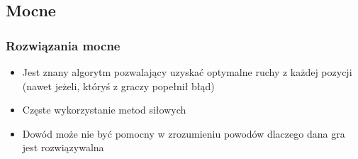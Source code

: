 \documentclass[polish,envcountsect,10pt]{beamer}
\begin{document}
        \subsection{Mocne}
            \begin{frame}
                \frametitle{Rozwiązania mocne}
                \begin{itemize}
                    \item<1-> Jest znany algorytm pozwalający uzyskać optymalne ruchy z każdej pozycji (nawet jeżeli, któryś z graczy popełnił błąd)
                    \item<2-> Częste wykorzystanie metod siłowych
                    \item<3-> Dowód może nie być pomocny w zrozumieniu powodów dlaczego dana gra jest rozwiązywalna
                \end{itemize}
            \end{frame}
\end{document}
